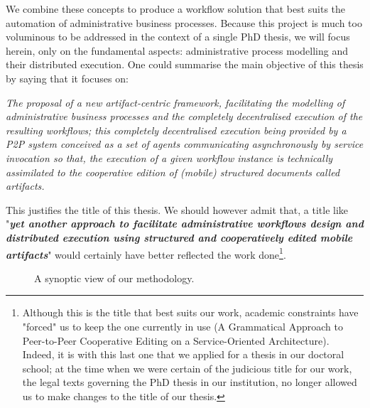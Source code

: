 We combine these concepts to produce a workflow solution that best suits the automation of administrative business processes. Because this project is much too voluminous to be addressed in the context of a single PhD thesis, we will focus herein, only on the fundamental aspects: administrative process modelling and their distributed execution. One could summarise the main objective of this thesis by saying that it focuses on:
\begin{displayquote}
\textit{The proposal of a new artifact-centric framework, facilitating the modelling of administrative business processes and the completely decentralised execution of the resulting workflows; this completely decentralised execution being provided by a P2P system conceived as a set of agents communicating asynchronously by service invocation so that, the execution of a given workflow instance is technically assimilated to the cooperative edition of (mobile) structured documents called artifacts.}
\end{displayquote}
This justifies the title of this thesis. We should however admit that, a title like "\textit{\textbf{yet another approach to facilitate administrative workflows design and distributed execution using structured and cooperatively edited mobile artifacts}}" would certainly have better reflected the work done\footnote{Although this is the title that best suits our work, academic constraints have "forced" us to keep the one currently in use (A Grammatical Approach to Peer-to-Peer Cooperative Editing on a Service-Oriented Architecture). Indeed, it is with this last one that we applied for a thesis in our doctoral school; at the time when we were certain of the judicious title for our work, the legal texts governing the PhD thesis in our institution, no longer allowed us to make changes to the title of our thesis.}.



\label{chap0:sec:engineering-overview}
\begin{figure}[ht!]
	\noindent
	\caption{A synoptic view of our methodology.}
	\label{chap0:fig:overview-methodology}
\end{figure}

